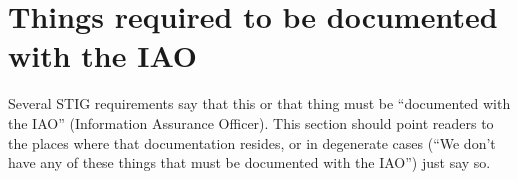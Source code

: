 %
%
%
%

\section{Things required to be documented with the IAO}
\label{DocumentedWithIAO}

Several STIG requirements say that this or that thing must be ``documented
with the IAO'' (Information Assurance Officer). This section should point
readers to the places where that documentation resides, or in degenerate
cases (``We don't have any of these things that must be documented with
the IAO'') just say so.

